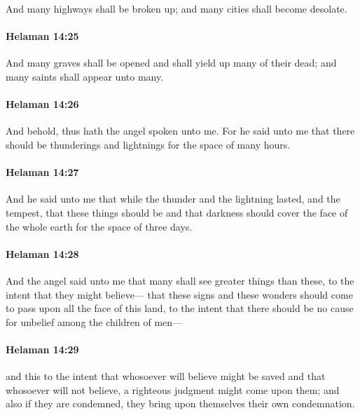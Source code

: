 			And many highways shall be broken up;
			and many cities shall become desolate.

		\paragraph{Helaman 14:25} %
			\label{HELAMAN-14-25}

			And many graves shall be opened
			and shall yield up many of their dead;
			and many saints shall appear unto many.

		\paragraph{Helaman 14:26} %
			\label{HELAMAN-14-26}

			And behold, thus hath the angel spoken unto me.
			For he said unto me that there should be thunderings and lightnings
			for the space of many hours.

		\paragraph{Helaman 14:27} %
			\label{HELAMAN-14-27}

			And he said unto me that
			while the thunder and the lightning lasted, and the tempest,
			that these things should be
			and that darkness should cover the face of the whole earth
			for the space of three days.

		\paragraph{Helaman 14:28} %
			\label{HELAMAN-14-28}

			And the angel said unto me
			that many shall see greater things than these,
			to the intent that they might believe---
			that these signs and these wonders should come to pass
			upon all the face of this land,
			to the intent that there should be no cause
			for unbelief among the children of men---

		\paragraph{Helaman 14:29} %
			\label{HELAMAN-14-29}

			and this to the intent that whosoever will believe might be saved
			and that whosoever will not believe, a righteous judgment might come upon them;
			and also if they are condemned,
			they bring upon themselves their own condemnation.

